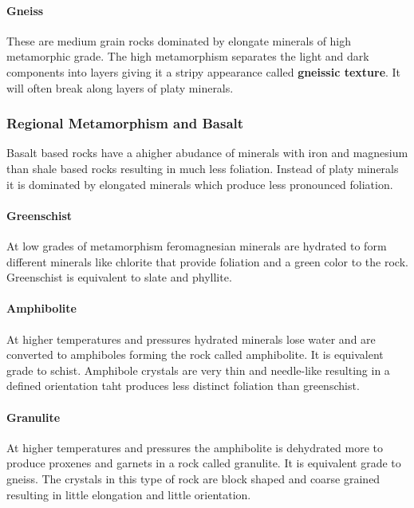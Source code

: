 \documentclass{article}
\begin{document}
\paragraph{Gneiss} %
\label{par:gneiss}
These are medium grain rocks dominated by elongate minerals of high metamorphic grade. The high metamorphism separates the light and dark components into layers giving it a stripy appearance called \textbf{gneissic texture}. It will often break along layers of platy minerals.

\subsubsection{Regional Metamorphism and Basalt} %
\label{sub:regional_metamorphism_and_basalt}
Basalt based rocks have a ahigher abudance of minerals with iron and magnesium than shale based rocks resulting in much less foliation. Instead of platy minerals it is dominated by elongated minerals which produce less pronounced foliation.

\paragraph{Greenschist} %
\label{par:greenschist}
At low grades of metamorphism feromagnesian minerals are hydrated to form different minerals like chlorite that provide foliation and a green color to the rock. Greenschist is equivalent to slate and phyllite.

\paragraph{Amphibolite} %
\label{par:amphibolite}
At higher temperatures and pressures hydrated minerals lose water and are converted to amphiboles forming the rock called amphibolite. It is equivalent grade to schist. Amphibole crystals are very thin and needle-like resulting in a defined orientation taht produces less distinct foliation than greenschist.

\paragraph{Granulite} %
\label{par:granulite}
At higher temperatures and pressures the amphibolite is dehydrated more to produce proxenes and garnets in a rock called granulite. It is equivalent grade to gneiss. The crystals in this type of rock are block shaped and coarse grained resulting in little elongation and little orientation.
\end{document}
